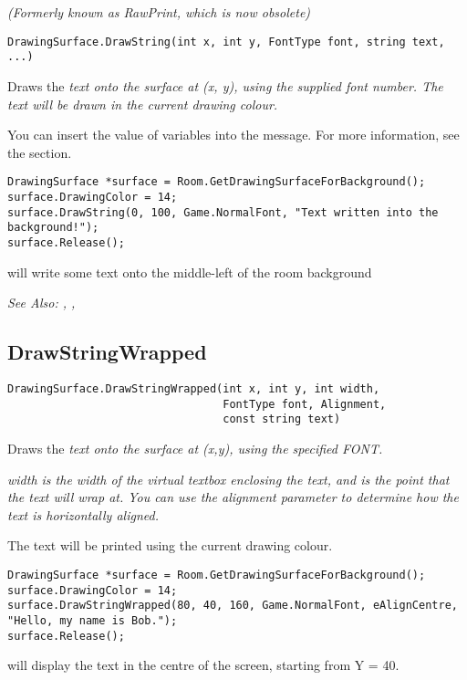 \it{(Formerly known as RawPrint, which is now obsolete)}

\begin{verbatim}
DrawingSurface.DrawString(int x, int y, FontType font, string text, ...)
\end{verbatim}
Draws the \it{text} onto the surface at (x, y), using the supplied font number.
The text will be drawn in the current drawing colour.

You can insert the value of variables into the message. For more information,
see the  section.

\begin{verbatim}
DrawingSurface *surface = Room.GetDrawingSurfaceForBackground();
surface.DrawingColor = 14;
surface.DrawString(0, 100, Game.NormalFont, "Text written into the background!");
surface.Release();
\end{verbatim}
will write some text onto the middle-left of the room background

\it{See Also:} ,
,


\subsection{DrawStringWrapped}\label{DrawingSurface.DrawStringWrapped}%

\begin{verbatim}
DrawingSurface.DrawStringWrapped(int x, int y, int width,
                                 FontType font, Alignment,
                                 const string text)
\end{verbatim}
Draws the \it{text} onto the surface at (x,y), using the specified FONT.

\it{width} is the width of the virtual textbox enclosing the text, and is the point
that the text will wrap at. You can use the \it{alignment} parameter to determine
how the text is horizontally aligned.

The text will be printed using the current drawing colour.

\begin{verbatim}
DrawingSurface *surface = Room.GetDrawingSurfaceForBackground();
surface.DrawingColor = 14;
surface.DrawStringWrapped(80, 40, 160, Game.NormalFont, eAlignCentre, "Hello, my name is Bob.");
surface.Release();
\end{verbatim}
will display the text in the centre of the screen, starting from Y = 40.


